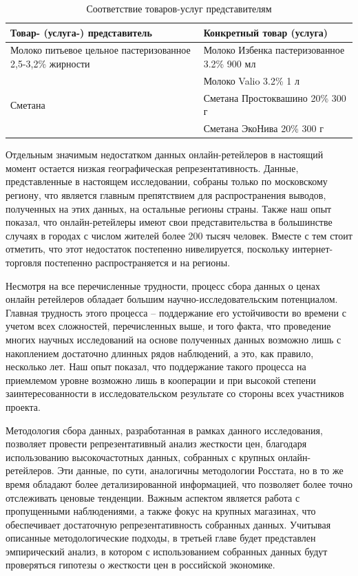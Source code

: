 \begin{table}[h]
	\centering
	\caption{Соответствие товаров-услуг представителям}
	\begin{tabularx}{\textwidth}{@{}XX@{}}
		\toprule
		
		\textbf{Товар- (услуга-) представитель} & \textbf{Конкретный товар (услуга)} \\ \midrule
		Молоко питьевое цельное пастеризованное 2,5-3,2\% жирности & Молоко Избенка пастеризованное 3.2\% 900 мл \\ 
		& Молоко Valio 3.2\% 1 л \\ \midrule
		Сметана & Сметана Простоквашино 20\% 300 г \\ 
		& Сметана ЭкоНива 20\% 300 г \\ 
		\bottomrule
	\end{tabularx}
	
	\label{tab:products_match}
\end{table}



Отдельным значимым недостатком данных онлайн-ретейлеров в настоящий момент остается низкая географическая репрезентативность. Данные, представленные в настоящем исследовании, собраны только по московскому региону, что является главным препятствием для распространения выводов, полученных на этих данных, на остальные регионы страны. Также наш опыт показал, что онлайн-ретейлеры имеют свои представительства в большинстве случаях в городах с числом жителей более 200 тысяч человек. Вместе с тем стоит отметить, что этот недостаток постепенно нивелируется, поскольку интернет-торговля постепенно распространяется и на регионы.  

Несмотря на все перечисленные трудности, процесс сбора данных о ценах онлайн ретейлеров обладает большим научно-исследовательским потенциалом. Главная трудность этого процесса – поддержание его устойчивости во времени с учетом всех сложностей, перечисленных выше, и того факта, что проведение многих научных исследований на основе полученных данных возможно лишь с накоплением достаточно длинных рядов наблюдений, а это, как правило, несколько лет. Наш опыт показал, что поддержание такого процесса на приемлемом уровне возможно лишь в кооперации и при высокой степени заинтересованности в исследовательском результате со стороны всех участников проекта.

Методология сбора данных, разработанная в рамках данного исследования, позволяет провести репрезентативный анализ жесткости цен, благодаря использованию высокочастотных данных, собранных с крупных онлайн-ретейлеров. Эти данные, по сути, аналогичны методологии Росстата, но в то же время обладают более детализированной информацией, что позволяет более точно отслеживать ценовые тенденции. Важным аспектом является работа с пропущенными наблюдениями, а также фокус на крупных магазинах, что обеспечивает достаточную репрезентативность собранных данных. Учитывая описанные методологические подходы, в третьей главе будет представлен эмпирический анализ, в котором с использованием собранных данных будут проверяться гипотезы о жесткости цен в российской экономике.




